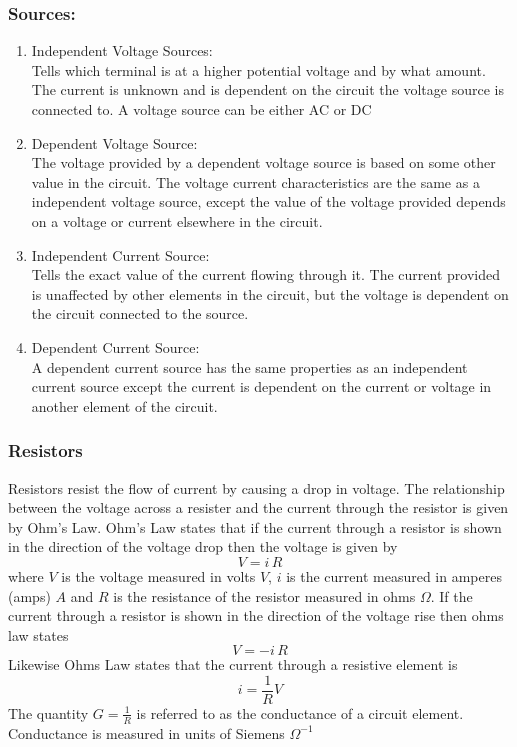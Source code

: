 \documentclass[14pt]{article}
\begin{document}
    \subsubsection{Sources:}
    \begin{enumerate}
        \item Independent Voltage Sources:\\
        Tells which terminal is at a higher potential voltage and by
        what amount. The current is unknown and is dependent on the
        circuit the voltage source is connected to. A voltage source can
        be either AC or DC
        \item Dependent Voltage Source:\\
        The voltage provided by a dependent voltage source is based on
        some other value in the circuit. The voltage current
        characteristics are the same as a independent voltage source,
        except the value of the voltage provided depends on a voltage or
        current elsewhere in the circuit. 
        \item Independent Current Source:\\
        Tells the exact value of the current flowing through it. The
        current provided is unaffected by other elements in the circuit,
        but the voltage is dependent on the circuit connected to the
        source.
        \item Dependent Current Source:\\
        A dependent current source has the same properties as an
        independent current source except the current is dependent on
        the current or voltage in another element of the circuit.
    \end{enumerate} 
    \subsubsection{Resistors}
    Resistors resist the flow of current by causing a drop in voltage.
    The relationship between the voltage across a resister and the
    current through the resistor is given by Ohm's Law. Ohm's Law states
    that if the current through a resistor is shown in the direction of
    the voltage drop then the voltage is given by $$V=i\,R$$ where $V$
    is the voltage measured in volts $V$, $i$ is the current measured in
    amperes (amps) $A$ and $R$ is the resistance of the resistor
    measured in ohms $\Omega$. If the current through a resistor is
    shown in the direction of the voltage rise then ohms law states
    $$V=-i\,R$$ Likewise Ohms Law states that the current through a
    resistive element is 
    $$i=\frac{1}{R}V$$ The quantity $G=\frac{1}{R}$ is referred to as
    the conductance of a circuit element. Conductance is measured in
    units of Siemens $\Omega^{-1}$
\end{document}
